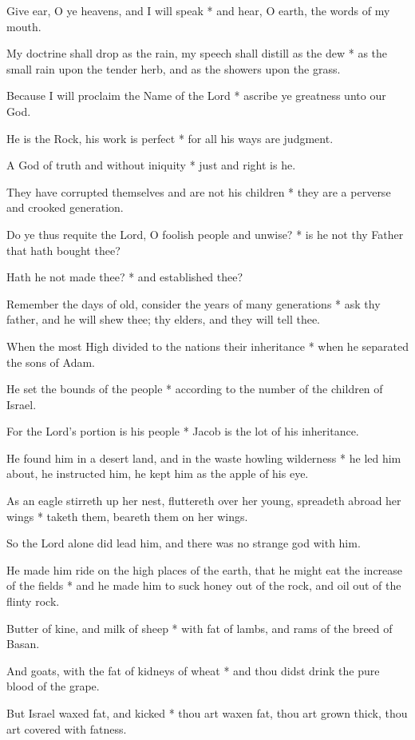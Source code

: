 Give ear, O ye heavens, and I will speak * and hear, O earth, the words of my mouth.

My doctrine shall drop as the rain, my speech shall distill as the dew * as the small rain upon the tender herb, and as the showers upon the grass.

Because I will proclaim the Name of the Lord * ascribe ye greatness unto our God.

He is the Rock, his work is perfect * for all his ways are judgment.

A God of truth and without iniquity * just and right is he.

They have corrupted themselves and are not his children * they are a perverse and crooked generation.

Do ye thus requite the Lord, O foolish people and unwise? * is he not thy Father that hath bought thee?

Hath he not made thee? * and established thee?

Remember the days of old, consider the years of many generations * ask thy father, and he will shew thee; thy elders, and they will tell thee.

When the most High divided to the nations their inheritance * when he separated the sons of Adam.

He set the bounds of the people * according to the number of the children of Israel.

For the Lord's portion is his people * Jacob is the lot of his inheritance.

He found him in a desert land, and in the waste howling wilderness * he led him about, he instructed him, he kept him as the apple of his eye.

As an eagle stirreth up her nest, fluttereth over her young, spreadeth abroad her wings * taketh them, beareth them on her wings.

So the Lord alone did lead him, and there was no strange god with him.

He made him ride on the high places of the earth, that he might eat the increase of the fields * and he made him to suck honey out of the rock, and oil out of the flinty rock.

Butter of kine, and milk of sheep * with fat of lambs, and rams of the breed of Basan.

And goats, with the fat of kidneys of wheat * and thou didst drink the pure blood of the grape.

But Israel waxed fat, and kicked * thou art waxen fat, thou art grown thick, thou art covered with fatness.

